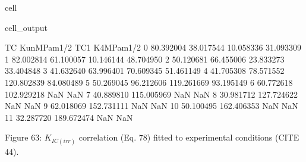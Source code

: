 \documentclass[letterpaper,10pt,english]{jupyterBook}
\begin{document}
\begin{sphinxuseclass}{cell}
\begin{sphinxVerbatimOutput}
			\begin{sphinxuseclass}{cell_output}
				\begin{sphinxVerbatim}[commandchars=\\\{\}]
					TC  K\PYGZus{}unMPam\PYGZca{}1/2         TC1  K\PYGZus{}4MPam\PYGZca{}1/2
					0  \PYGZhy{}80.392004     38.017544  \PYGZhy{}10.058336    31.093309
					1  \PYGZhy{}82.002814     61.100057  \PYGZhy{}10.146144    48.704950
					2  \PYGZhy{}50.120681     66.455006   23.833273    33.404848
					3  \PYGZhy{}41.632640     63.996401   70.609345    51.461149
					4  \PYGZhy{}41.705308     78.571552  120.802839    84.080489
					5  \PYGZhy{}50.269045     96.212606  119.261669    93.195149
					6  \PYGZhy{}60.772618    102.929218         NaN          NaN
					7  \PYGZhy{}40.889810    115.005969         NaN          NaN
					8  \PYGZhy{}30.981712    127.724622         NaN          NaN
					9  \PYGZhy{}62.018069    152.731111         NaN          NaN
					10 \PYGZhy{}50.100495    162.406353         NaN          NaN
					11 \PYGZhy{}32.287720    189.672474         NaN          NaN
				\end{sphinxVerbatim}
				
				\noindent{}
				
		\end{sphinxuseclass}\end{sphinxVerbatimOutput}
		
	\end{sphinxuseclass}
	\sphinxAtStartPar
	Figure 63: \(K_{IC(irr)}\) correlation (Eq. 78) fitted to experimental conditions (CITE 44).
	
\end{document}
